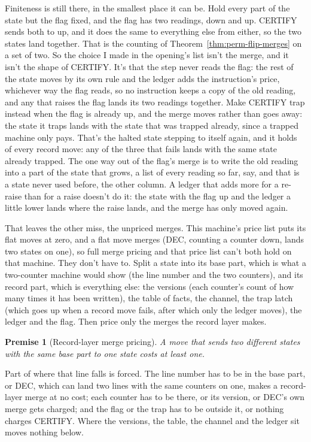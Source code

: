 \documentclass[11pt,twoside]{article}
\theoremstyle{thielethm}
\theoremstyle{thieledef}
\theoremstyle{thieledef}
\theoremstyle{thieledef}
\newtheorem{premise}[definition]{Premise}
\theoremstyle{thielethm}
\theoremstyle{thieleobs}
\theoremstyle{thielethm}
\begin{document}
Finiteness is still there, in the smallest place it can be. Hold every part of the state but the
flag fixed, and the flag has two readings, down and up. CERTIFY sends both to up, and it does the
same to everything else from either, so the two states land together. That is the counting of
Theorem~\ref{thm:perm-flip-merges} on a set of two. So the choice I made in the opening's list isn't the merge, and it isn't the shape of CERTIFY. It's that the step never reads the flag: the rest of the state moves by its own rule and the ledger adds the instruction's price, whichever way the flag reads, so no instruction keeps a copy of the old reading, and any that raises the flag lands its two readings together. Make CERTIFY trap instead when the flag is already up, and the merge moves rather than goes away: the state it traps lands with the state that was trapped already, since a trapped machine only pays. That's the halted state stepping to itself again, and it holds of every record move: any of the three that fails lands with the same state already trapped. The one way out of the flag's merge is to write the old reading into a part of the state that grows, a list of every reading so far, say, and that is a state never used before, the other column. A ledger that adds more for a re-raise than for a raise doesn't do it: the state with the flag up and the ledger a little lower lands where the raise lands, and the merge has only moved again.

That leaves the other miss, the unpriced merges. This machine's price list puts
its flat moves at zero, and a flat move merges (DEC, counting a counter down, lands two states on one),
so full merge pricing and that price list can't both hold on that machine. They don't have to. Split a
state into its base part, which is what a two-counter machine would show (the line number and the
two counters), and its record part, which is everything else: the versions (each counter's count
of how many times it has been written), the table of facts, the channel, the trap latch (which goes up when a record move fails, after which only the ledger moves), the ledger and the flag. Then price only the merges the record layer
makes.

\begin{premise}[Record-layer merge pricing]\label{prem:record-merge}
A move that sends two different states with the same base part to one state costs at least one. \end{premise} Part of where that line falls is forced. The line number has to be in the base part, or DEC, which can land two lines with the same counters on one, makes a record-layer merge at no cost; each counter has to be there, or its version, or DEC's own merge gets charged; and the flag or the trap has to be outside it, or nothing charges CERTIFY. Where the versions, the table, the channel and the ledger sit moves nothing below.
\end{document}
